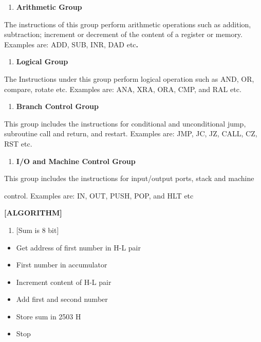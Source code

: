 \documentclass[11pt,twocolumn]{article}
\begin{document}
\begin{enumerate}
\def\labelenumi{\arabic{enumi}.}
\setcounter{enumi}{1}
\tightlist
\item
  \textbf{Arithmetic Group}
\end{enumerate}

The instructions of this group perform arithmetic operations such as
addition, subtraction; increment or decrement of the content of a
register or memory. Examples are: ADD, SUB, INR, DAD etc\textbf{.}

\begin{enumerate}
\def\labelenumi{\arabic{enumi}.}
\setcounter{enumi}{2}
\tightlist
\item
  \textbf{Logical Group}
\end{enumerate}

The Instructions under this group perform logical operation such as AND,
OR, compare, rotate etc. Examples are: ANA, XRA, ORA, CMP, and RAL etc.

\begin{enumerate}
\def\labelenumi{\arabic{enumi}.}
\setcounter{enumi}{3}
\tightlist
\item
  \textbf{Branch Control Group}
\end{enumerate}

This group includes the instructions for conditional and unconditional
jump, subroutine call and return, and restart. Examples are: JMP, JC,
JZ, CALL, CZ, RST etc.

\begin{enumerate}
\def\labelenumi{\arabic{enumi}.}
\setcounter{enumi}{4}
\tightlist
\item
  \textbf{I/O and Machine Control Group}
\end{enumerate}

This group includes the instructions for input/output ports, stack and
machine

control. Examples are: IN, OUT, PUSH, POP, and HLT etc

\textbf{{[}ALGORITHM{]}}

\begin{enumerate}
\def\labelenumi{\alph{enumi})}
\tightlist
\item
  {[}Sum is 8 bit{]}
\end{enumerate}

\begin{itemize}
\item
  Get address of first number in H-L pair
\item
  First number in accumulator
\item
  Increment content of H-L pair
\item
  Add first and second number
\item
  Store sum in 2503 H
\item
  Stop
\end{itemize}
\end{document}
